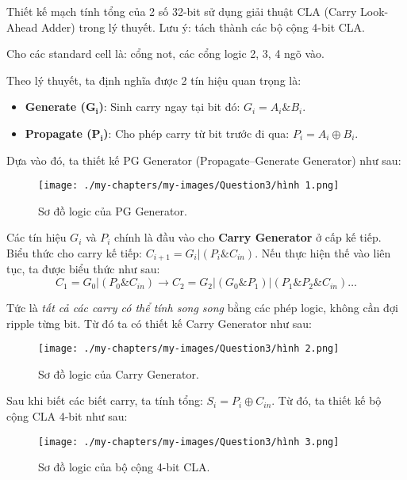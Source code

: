 
Thiết kế mạch tính tổng của 2 số 32-bit sử dụng giải thuật CLA (Carry Look-Ahead Adder) trong lý thuyết. Lưu ý: tách thành các bộ cộng 4-bit CLA.

Cho các standard cell là: cổng not, các cổng logic 2, 3, 4 ngõ vào.


Theo lý thuyết, ta định nghĩa được 2 tín hiệu quan trọng là:

\begin{itemize}[label=-]
	\item \textbf{Generate ($\mathbf{G_{i}}$)}: Sinh carry ngay tại bit đó: $G_{i} = A_{i} \& B_{i}$.
	\item \textbf{Propagate ($\mathbf{P_{i}}$)}: Cho phép carry từ bit trước đi qua: $P_{i} = A_{i} \oplus B_{i}$.
\end{itemize}

Dựa vào đó, ta thiết kế PG Generator (Propagate–Generate Generator) như sau:

\begin{figure}[H]
	\centering
	\texttt{[image: ./my-chapters/my-images/Question3/hình 1.png]}
	\caption{Sơ đồ logic của PG Generator.}
\end{figure}

Các tín hiệu $G_{i}$ và $P_{i}$ chính là đầu vào cho \textbf{Carry Generator} ở cấp kế tiếp. Biểu thức cho carry kế tiếp: $C_{i+1} = G_{i} | (P_{i} \& C_{in})$. Nếu thực hiện thế vào liên tục, ta được biểu thức như sau:
\[ C_1=G_0 | (P_0 \& C_{in}) \rightarrow C_2=G_2 | (G_0 \& P_1) | (P_1 \& P_2 \& C_{in}) \dots\]

Tức là \textit{tất cả các carry có thể tính song song} bằng các phép logic, không cần đợi ripple từng bit. Từ đó ta có thiết kế Carry Generator như sau:

\begin{figure}[H]
	\centering
	\texttt{[image: ./my-chapters/my-images/Question3/hình 2.png]}
	\caption{Sơ đồ logic của Carry Generator.}
\end{figure}

Sau khi biết các biết carry, ta tính tổng: $S_i = P_i \oplus C_{in}$. Từ đó, ta thiết kế bộ cộng CLA 4-bit như sau:

\begin{figure}[H]
	\centering
	\texttt{[image: ./my-chapters/my-images/Question3/hình 3.png]}
	\caption{Sơ đồ logic của bộ cộng 4-bit CLA.}
\end{figure}

